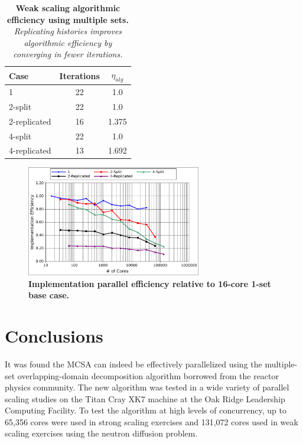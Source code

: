 \documentclass{snamc2013}
\begin{document}
\begin{table}[h!]
  \begin{center}
    \begin{tabular}{lcc}\hline\hline
      \multicolumn{1}{l}{Case}& 
      \multicolumn{1}{c}{Iterations}&
      \multicolumn{1}{c}{$\eta_{alg}$} \\\hline
      1 & 22 & 1.0 \\
      2-split & 22 & 1.0 \\
      2-replicated & 16 & 1.375 \\
      4-split & 22 & 1.0 \\
      4-replicated & 13 & 1.692 \\
      \hline\hline
    \end{tabular}
  \end{center}
  \caption{\textbf{Weak scaling algorithmic efficiency using multiple
      sets.} \textit{Replicating histories improves algorithmic
      efficiency by converging in fewer iterations.}}
  \label{tab:ms_weak_alg_eff}
\end{table}

\begin{figure}[h!]
  \begin{center}
    \includegraphics[width=3in]{titan_weak_ms_impeff.pdf}
  \end{center}
  \caption{\textbf{Implementation parallel efficiency relative to 16-core
      1-set base case.}}
  \label{fig:titan_weak_ms_impeff}
\end{figure}

\section{Conclusions}

It was found the MCSA can indeed be effectively parallelized using the
multiple-set overlapping-domain decomposition algorithm borrowed from
the reactor physics community.  The new algorithm was tested in a wide
variety of parallel scaling studies on the Titan Cray XK7 machine at
the Oak Ridge Leadership Computing Facility. To test the algorithm at
high levels of concurrency, up to 65,356 cores were used in strong
scaling exercises and 131,072 cores used in weak scaling exercises
using the neutron diffusion problem.
\end{document}
